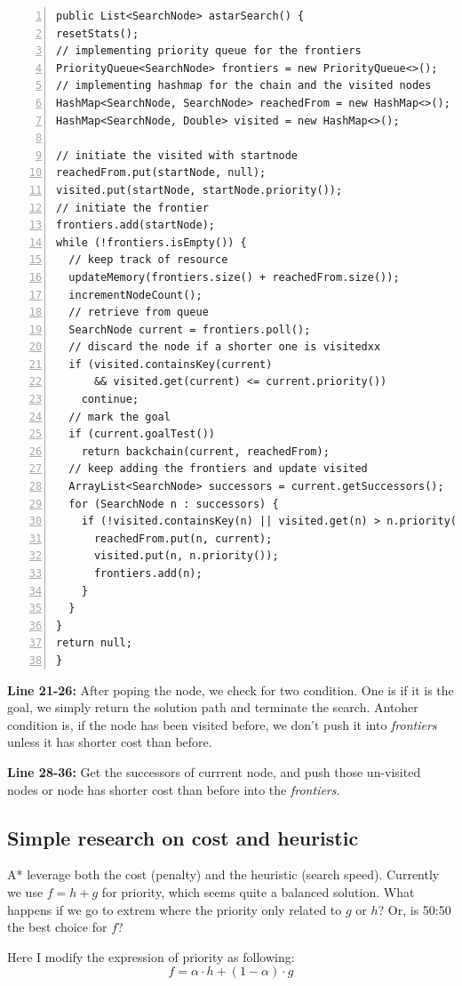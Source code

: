 \begin{lstlisting}[numbers=left]
public List<SearchNode> astarSearch() {
resetStats();
// implementing priority queue for the frontiers
PriorityQueue<SearchNode> frontiers = new PriorityQueue<>();
// implementing hashmap for the chain and the visited nodes
HashMap<SearchNode, SearchNode> reachedFrom = new HashMap<>();
HashMap<SearchNode, Double> visited = new HashMap<>();

// initiate the visited with startnode
reachedFrom.put(startNode, null);
visited.put(startNode, startNode.priority());
// initiate the frontier
frontiers.add(startNode);
while (!frontiers.isEmpty()) {
  // keep track of resource
  updateMemory(frontiers.size() + reachedFrom.size());
  incrementNodeCount();
  // retrieve from queue
  SearchNode current = frontiers.poll();
  // discard the node if a shorter one is visitedxx
  if (visited.containsKey(current)
	  && visited.get(current) <= current.priority())
	continue;
  // mark the goal
  if (current.goalTest())
	return backchain(current, reachedFrom);
  // keep adding the frontiers and update visited
  ArrayList<SearchNode> successors = current.getSuccessors();
  for (SearchNode n : successors) {
	if (!visited.containsKey(n) || visited.get(n) > n.priority()) {
	  reachedFrom.put(n, current);
	  visited.put(n, n.priority());
	  frontiers.add(n);
	}
  }
}
return null;
}
\end{lstlisting}

\textbf{Line 21-26:} After poping the node, we check for two condition. One is if it is the goal, we simply return the solution path and terminate the search. Antoher condition is, if the node has been visited before, we don't push it into \emph{frontiers} unless it has shorter cost than before.

\textbf{Line 28-36:} Get the successors of currrent node, and push those un-visited nodes or node has shorter cost than before into the \emph{frontiers}.

\subsection{Simple research on cost and heuristic}
A* leverage both the cost (penalty) and the heuristic (search speed). Currently we use $f = h + g$ for priority, which seems quite a balanced solution. What happens if we go to extrem where the priority only related to $g$ or $h$? Or, is 50:50 the best choice for $f$?

Here I modify the expression of priority as following:
$$f = \alpha \cdot h + (1 - \alpha ) \cdot g$$